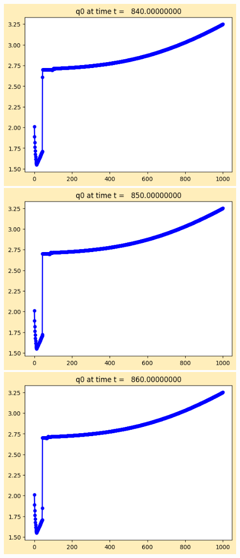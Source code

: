 \documentclass[11pt]{article}
\begin{document}
\vskip 10pt 
\includegraphics[width=0.95\textwidth]{frame0084fig1.png}
\vskip 10pt 
\includegraphics[width=0.95\textwidth]{frame0085fig1.png}
\vskip 10pt 
\includegraphics[width=0.95\textwidth]{frame0086fig1.png}
\end{document}
